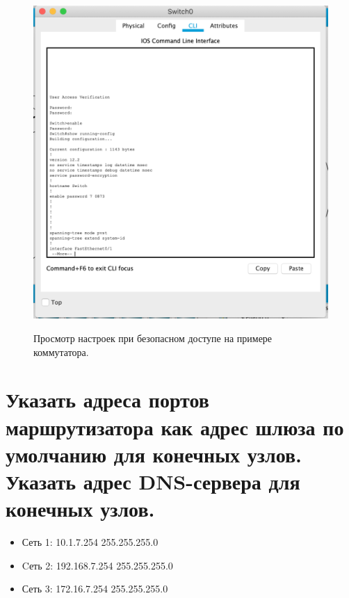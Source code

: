 \documentclass[a4paper,12pt]{article}
\begin{document}
	\begin{figure}[h!]
		\begin{center}
			{\includegraphics[scale = 0.6]{3.png}}
			\label{ris:3}
		\end{center}
		\caption{Просмотр настроек при безопасном доступе на примере коммутатора.}
	\end{figure}

	\newpage
	
	\section{Указать адреса портов маршрутизатора как адрес шлюза по умолчанию для конечных узлов. Указать адрес DNS-сервера для конечных узлов.}
	
	\begin{itemize}
		\item Сеть 1: 10.1.7.254 255.255.255.0
		\item Cеть 2: 192.168.7.254 255.255.255.0
		\item Сеть 3: 172.16.7.254 255.255.255.0
	\end{itemize}
\end{document}
